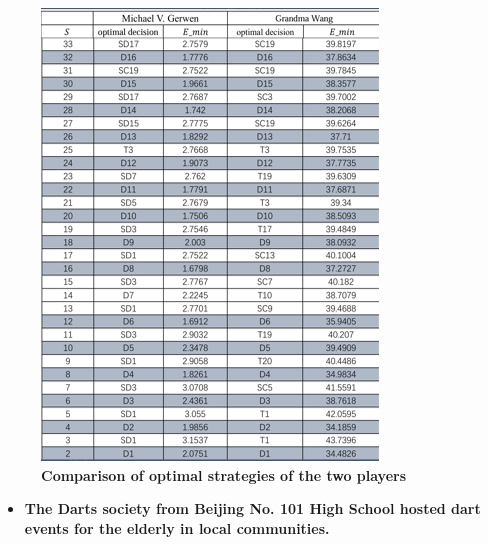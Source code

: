 \documentclass[cjjs]{ipart}
\theoremstyle{plain}
\begin{document}
\begin{figure}[H]
\begin{minipage}{0.45\textwidth}
        \includegraphics[width=\textwidth]{picture2.png} 
        \caption{\textbf{Comparison of optimal strategies of the two players}}  
        \label{fig:image2}
    \end{minipage}
\end{figure}

\begin{itemize}
    \item \textbf{The Darts society from Beijing No. 101 High School hosted dart events for the elderly in local communities.}
\end{itemize}
\end{document}
